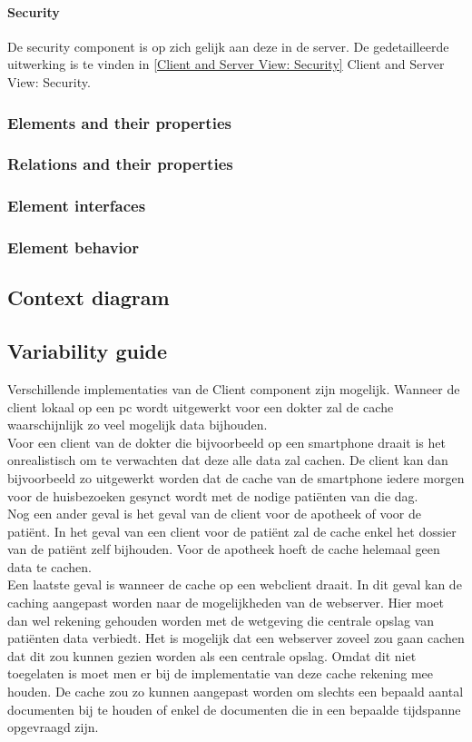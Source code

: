 \documentclass[a4paper,10pt]{book}
\begin{document}
\paragraph{Security}
De security component is op zich gelijk aan deze in de server.  De gedetailleerde uitwerking is te vinden in \ref{Client and Server View: Security} Client and Server View: Security.


\subsubsection{Elements and their properties}

\subsubsection{Relations and their properties}

\subsubsection{Element interfaces}

\subsubsection{Element behavior}

\subsection{Context diagram}

\subsection{Variability guide}
Verschillende implementaties van de Client component zijn mogelijk.  Wanneer de client lokaal op een pc wordt uitgewerkt voor een dokter zal de cache waarschijnlijk zo veel mogelijk data bijhouden.\\
Voor een client van de dokter die bijvoorbeeld op een smartphone draait is het onrealistisch om te verwachten dat deze alle data zal cachen.  De client kan dan bijvoorbeeld zo uitgewerkt worden dat de cache van de smartphone iedere morgen voor de huisbezoeken gesynct wordt met de nodige pati\"{e}nten van die dag.\\
Nog een ander geval is het geval van de client voor de apotheek of voor de pati\"{e}nt.  In het geval van een client voor de pati\"{e}nt zal de cache enkel het dossier van de pati\"{e}nt zelf bijhouden.  Voor de apotheek hoeft de cache helemaal geen data te cachen.\\
Een laatste geval is wanneer de cache op een webclient draait.  In dit geval kan de caching aangepast worden naar de mogelijkheden van de webserver.  Hier moet dan wel rekening gehouden worden met de wetgeving die centrale opslag van pati\"{e}nten data verbiedt.  Het is mogelijk dat een webserver zoveel zou gaan cachen dat dit zou kunnen gezien worden als een centrale opslag.  Omdat dit niet toegelaten is moet men er bij de implementatie van deze cache rekening mee houden.  De cache zou zo kunnen aangepast worden om slechts een bepaald aantal documenten bij te houden of enkel de documenten die in een bepaalde tijdspanne opgevraagd zijn.
\end{document}
